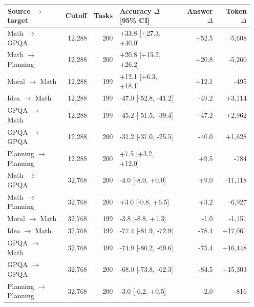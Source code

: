 \begin{tabular}{lrrlrr}
\toprule Source $\to$ target & Cutoff & Tasks & Accuracy $\Delta$ [95\% CI] & Answer $\Delta$ & Token $\Delta$ \\
\midrule
Math $\to$ GPQA & 12,288 & 200 & +33.8 [+27.3, +40.0] & +52.5 & -5,608 \\
Math $\to$ Planning & 12,288 & 200 & +20.8 [+15.2, +26.2] & +20.8 & -5,260 \\
Moral $\to$ Math & 12,288 & 199 & +12.1 [+6.3, +18.1] & +12.1 & -495 \\
Idea $\to$ Math & 12,288 & 199 & -47.0 [-52.8, -41.2] & -49.2 & +3,114 \\
GPQA $\to$ Math & 12,288 & 199 & -45.2 [-51.5, -39.4] & -47.2 & +2,962 \\
GPQA $\to$ GPQA & 12,288 & 200 & -31.2 [-37.0, -25.5] & -40.0 & +1,628 \\
Planning $\to$ Planning & 12,288 & 200 & +7.5 [+3.2, +12.0] & +9.5 & -784 \\
Math $\to$ GPQA & 32,768 & 200 & -4.0 [-8.0, +0.0] & +9.0 & -11,118 \\
Math $\to$ Planning & 32,768 & 200 & +3.0 [-0.8, +6.5] & +3.2 & -6,927 \\
Moral $\to$ Math & 32,768 & 199 & -3.8 [-8.8, +1.3] & -1.0 & -1,151 \\
Idea $\to$ Math & 32,768 & 199 & -77.4 [-81.9, -72.9] & -78.4 & +17,061 \\
GPQA $\to$ Math & 32,768 & 199 & -74.9 [-80.2, -69.6] & -75.4 & +16,448 \\
GPQA $\to$ GPQA & 32,768 & 200 & -68.0 [-73.8, -62.3] & -84.5 & +15,303 \\
Planning $\to$ Planning & 32,768 & 200 & -3.0 [-6.2, +0.5] & -2.0 & -816 \\
\bottomrule
\end{tabular}
